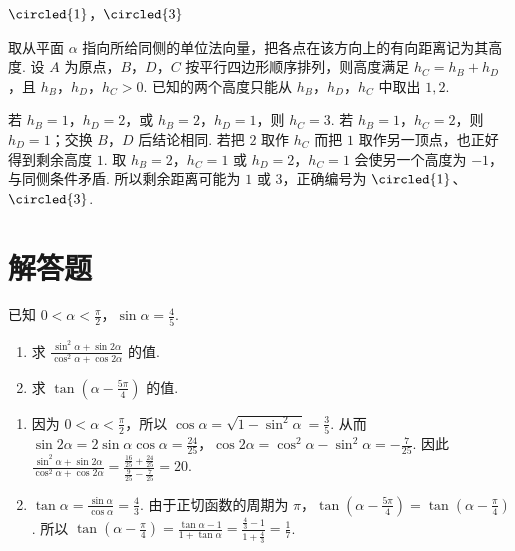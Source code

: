 \begin{answer}
\(\circled{1}\)，\(\circled{3}\)
\end{answer}

\begin{solution}
取从平面 \(\alpha\) 指向所给同侧的单位法向量，把各点在该方向上的有向距离记为其高度. 设 \(A\) 为原点，\(B\)，\(D\)，\(C\) 按平行四边形顺序排列，则高度满足 \(h_C=h_B+h_D\)，且 \(h_B\)，\(h_D\)，\(h_C>0\). 已知的两个高度只能从 \(h_B\)，\(h_D\)，\(h_C\) 中取出 \(1,2\).

若 \(h_B=1\)，\(h_D=2\)，或 \(h_B=2\)，\(h_D=1\)，则 \(h_C=3\). 若 \(h_B=1\)，\(h_C=2\)，则 \(h_D=1\)；交换 \(B\)，\(D\) 后结论相同. 若把 \(2\) 取作 \(h_C\) 而把 \(1\) 取作另一顶点，也正好得到剩余高度 \(1\). 取 \(h_B=2\)，\(h_C=1\) 或 \(h_D=2\)，\(h_C=1\) 会使另一个高度为 \(-1\)，与同侧条件矛盾. 所以剩余距离可能为 \(1\) 或 \(3\)，正确编号为 \(\circled{1}\)、\(\circled{3}\).
\end{solution}

\section{解答题}
\begin{problem}
已知 \(0 < \alpha < \frac{\pi}{2}\)，\(\sin \alpha = \frac{4}{5}\).

\begin{enumerate}
\item 求 \( \frac{\sin^{2}\alpha + \sin 2\alpha}{\cos^{2}\alpha + \cos 2\alpha} \) 的值.
\item 求 \( \tan\left(\alpha-\frac{5\pi}{4}\right) \) 的值.
\end{enumerate}
\end{problem}

\begin{solution}
\begin{enumerate}
\item 因为 \(0<\alpha<\frac\pi2\)，所以 \(\cos\alpha=\sqrt{1-\sin^2\alpha}=\frac35\). 从而 \(\sin2\alpha=2\sin\alpha\cos\alpha=\frac{24}{25}\)，\(\cos2\alpha=\cos^2\alpha-\sin^2\alpha=-\frac7{25}\). 因此
\(\frac{\sin^2\alpha+\sin2\alpha}{\cos^2\alpha+\cos2\alpha}=\frac{\frac{16}{25}+\frac{24}{25}}{\frac9{25}-\frac7{25}}=20\).
\item \(\tan\alpha=\frac{\sin\alpha}{\cos\alpha}=\frac43\). 由于正切函数的周期为 \(\pi\)，\(\tan\left(\alpha-\frac{5\pi}{4}\right)=\tan\left(\alpha-\frac\pi4\right)\). 所以
\(\tan\left(\alpha-\frac\pi4\right)=\frac{\tan\alpha-1}{1+\tan\alpha}=\frac{\frac43-1}{1+\frac43}=\frac17\).
\end{enumerate}
\end{solution}

